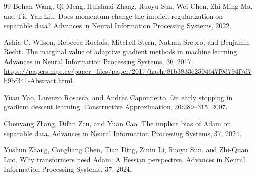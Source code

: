 \documentclass[11pt,twoside]{article}
\theoremstyle{definition}
\theoremstyle{remark}
\begin{document}
\begin{thebibliography}{99}
Bohan Wang, Qi Meng, Huishuai Zhang, Ruoyu Sun, Wei Chen, Zhi-Ming Ma, and
Tie-Yan Liu.
\newblock Does momentum change the implicit regularization on separable data?
\newblock Advances in Neural Information Processing Systems, 2022.

Ashia C. Wilson, Rebecca Roelofs, Mitchell Stern, Nathan Srebro, and
Benjamin Recht.
\newblock The marginal value of adaptive gradient methods in machine
learning.
\newblock Advances in Neural Information Processing Systems, 30, 2017.
\newblock \url{https://papers.nips.cc/paper_files/paper/2017/hash/81b3833e2504647f9d794f7d7b9bf341-Abstract.html}.

Yuan Yao, Lorenzo Rosasco, and Andrea Caponnetto.
\newblock On early stopping in gradient descent learning.
\newblock Constructive Approximation, 26:289--315, 2007.

Chenyang Zhang, Difan Zou, and Yuan Cao.
\newblock The implicit bias of Adam on separable data.
\newblock Advances in Neural Information Processing Systems, 37, 2024.

Yushun Zhang, Congliang Chen, Tian Ding, Ziniu Li, Ruoyu Sun, and
Zhi-Quan Luo.
\newblock Why transformers need Adam: A Hessian perspective.
\newblock Advances in Neural Information Processing Systems, 37, 2024.

\end{thebibliography}
\end{document}
